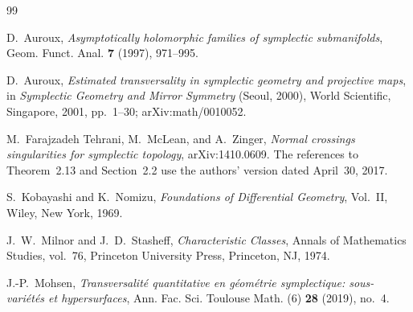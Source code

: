 \documentclass[11pt]{amsart}
\theoremstyle{definition}
\theoremstyle{remark}
\begin{document}
\begin{thebibliography}{99}

D.~Auroux,
\emph{Asymptotically holomorphic families of symplectic submanifolds},
Geom. Funct. Anal. \textbf{7} (1997), 971--995.

D.~Auroux,
\emph{Estimated transversality in symplectic geometry and projective maps},
in \emph{Symplectic Geometry and Mirror Symmetry}
(Seoul, 2000), World Scientific, Singapore, 2001, pp.~1--30;
arXiv:math/0010052.

M.~Farajzadeh Tehrani, M.~McLean, and A.~Zinger,
\emph{Normal crossings singularities for symplectic topology},
arXiv:1410.0609.
The references to Theorem~2.13 and Section~2.2 use the authors'
version dated April~30, 2017.

S.~Kobayashi and K.~Nomizu,
\emph{Foundations of Differential Geometry}, Vol.~II,
Wiley, New York, 1969.

J.~W.~Milnor and J.~D.~Stasheff,
\emph{Characteristic Classes},
Annals of Mathematics Studies, vol.~76,
Princeton University Press, Princeton, NJ, 1974.

J.-P.~Mohsen,
\emph{Transversalit\'e quantitative en g\'eom\'etrie symplectique:
sous-vari\'et\'es et hypersurfaces},
Ann. Fac. Sci. Toulouse Math. (6) \textbf{28} (2019), no.~4.

\end{thebibliography}
\end{document}
